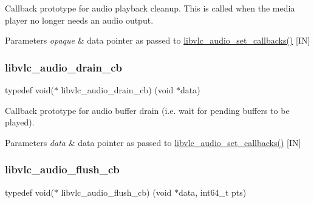 Callback prototype for audio playback cleanup. This is called when the media player no longer needs an audio output. 
\begin{DoxyParams}{Parameters}
{\em opaque} & data pointer as passed to \hyperlink{group__libvlc__media__player_gaac7abb1d8be3f60bb9da20c000703790}{libvlc\+\_\+audio\+\_\+set\+\_\+callbacks()} \mbox{[}IN\mbox{]} \\
\hline
\end{DoxyParams}
\mbox{\label{group__libvlc__media__player_gaf25ee69cefcb19ae1a1751b7ba73cf41}} 
\subsubsection{\texorpdfstring{libvlc\+\_\+audio\+\_\+drain\+\_\+cb}{libvlc\_audio\_drain\_cb}}
{\footnotesize\ttfamily typedef void($\ast$ libvlc\+\_\+audio\+\_\+drain\+\_\+cb) (void $\ast$data)}

Callback prototype for audio buffer drain (i.\+e. wait for pending buffers to be played). 
\begin{DoxyParams}{Parameters}
{\em data} & data pointer as passed to \hyperlink{group__libvlc__media__player_gaac7abb1d8be3f60bb9da20c000703790}{libvlc\+\_\+audio\+\_\+set\+\_\+callbacks()} \mbox{[}IN\mbox{]} \\
\hline
\end{DoxyParams}
\mbox{\label{group__libvlc__media__player_ga7ab971890ddbf306331989d60b88c171}} 
\subsubsection{\texorpdfstring{libvlc\+\_\+audio\+\_\+flush\+\_\+cb}{libvlc\_audio\_flush\_cb}}
{\footnotesize\ttfamily typedef void($\ast$ libvlc\+\_\+audio\+\_\+flush\+\_\+cb) (void $\ast$data, int64\+\_\+t pts)}

